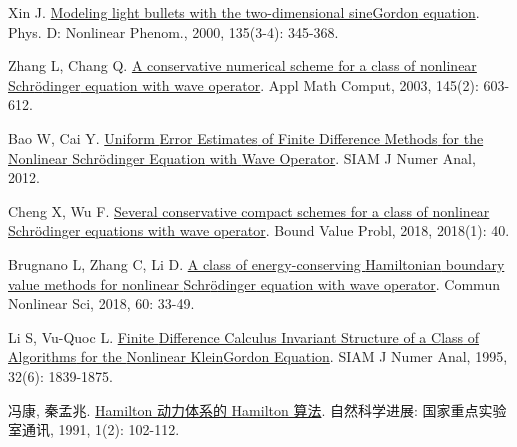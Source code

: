 \begin{thebibliography}{79}
    Xin J.
    \newblock \href{https://linkinghub.elsevier.com/retrieve/pii/S0167278999001281}{Modeling light bullets with the two-dimensional sine{\textendash}{{Gordon}} equation}\allowbreak[J].
    \newblock Phys. D: Nonlinear Phenom., 2000, 135\allowbreak (3-4): 345-368.
    
    Zhang L, Chang Q.
    \newblock \href{https://www.sciencedirect.com/science/article/pii/S0096300302008421}{A conservative numerical scheme for a class of nonlinear {{Schr{\"o}dinger}} equation with wave operator}\allowbreak[J].
    \newblock Appl Math Comput, 2003, 145\allowbreak (2): 603-612.
    
    Bao W, Cai Y.
    \newblock \href{https://epubs.siam.org/doi/10.1137/110830800}{Uniform {{Error Estimates}} of {{Finite Difference Methods}} for the {{Nonlinear Schr{\"o}dinger Equation}} with {{Wave Operator}}}\allowbreak[J].
    \newblock SIAM J Numer Anal, 2012.
    
    Cheng X, Wu F.
    \newblock \href{https://boundaryvalueproblems.springeropen.com/articles/10.1186/s13661-018-0956-4}{Several conservative compact schemes for a class of nonlinear {{Schr{\"o}dinger}} equations with wave operator}\allowbreak[J].
    \newblock Bound Value Probl, 2018, 2018\allowbreak (1): 40.
    
    Brugnano L, Zhang C, Li D.
    \newblock \href{https://linkinghub.elsevier.com/retrieve/pii/S1007570417304409}{A class of energy-conserving {{Hamiltonian}} boundary value methods for nonlinear {{Schr{\"o}dinger}} equation with wave operator}\allowbreak[J].
    \newblock Commun Nonlinear Sci, 2018, 60: 33-49.
    
    Li S, {Vu-Quoc} L.
    \newblock \href{https://epubs.siam.org/doi/10.1137/0732083}{Finite {{Difference Calculus Invariant Structure}} of a {{Class}} of {{Algorithms}} for the {{Nonlinear Klein}}{\textendash}{{Gordon Equation}}}\allowbreak[J].
    \newblock SIAM J Numer Anal, 1995, 32\allowbreak (6): 1839-1875.
    
    冯康, 秦孟兆.
    \newblock \href{https://linkinghub.elsevier.com/retrieve/pii/S0096300318304983}{Hamilton 动力体系的 Hamilton 算法}\allowbreak[J].
    \newblock 自然科学进展: 国家重点实验室通讯, 1991, 1(2): 102-112.


\end{thebibliography}
